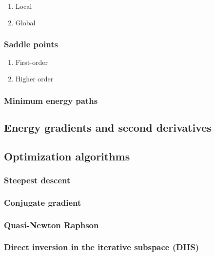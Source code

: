 \documentclass[11pt]{article}
\begin{document}
\begin{enumerate}
\item Local
\label{sec-6-2-3-1}

\item Global
\label{sec-6-2-3-2}
\end{enumerate}

\subsubsection{Saddle points}
\label{sec-6-2-4}

\begin{enumerate}
\item First-order
\label{sec-6-2-4-1}

\item Higher order
\label{sec-6-2-4-2}
\end{enumerate}

\subsubsection{Minimum energy paths}
\label{sec-6-2-5}

\subsection{Energy gradients and second derivatives}
\label{sec-6-3}

\subsection{Optimization algorithms}
\label{sec-6-4}
\subsubsection{Steepest descent}
\label{sec-6-4-1}

\subsubsection{Conjugate gradient}
\label{sec-6-4-2}

\subsubsection{Quasi-Newton Raphson}
\label{sec-6-4-3}


\subsubsection{Direct inversion in the iterative subspace (DIIS)}
\label{sec-6-4-4}
\end{document}
